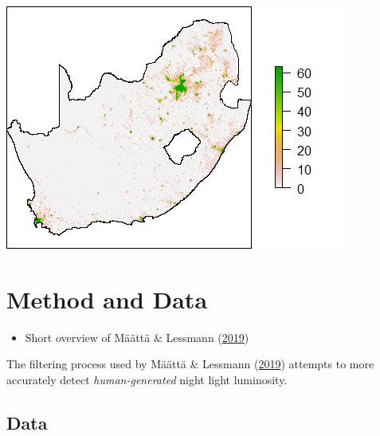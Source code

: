 \documentclass[11pt,preprint, authoryear]{elsarticle}
\let\origfigure\figure
\let\endorigfigure\endfigure
\renewenvironment{figure}[1][2] {
    \expandafter\origfigure\expandafter[H]
} {
    \endorigfigure
}
\numberwithin{equation}{section}
\numberwithin{figure}{section}
\numberwithin{table}{section}
\def\tightlist{} %
\begin{document}
\begin{figure}[H]
\includegraphics[width=1\linewidth]{figures/final} \caption{\label{result_plot} Human Lights Image }\label{fig:final}
\end{figure}

\hypertarget{method-and-data}{%
\section{\texorpdfstring{Method and Data
\label{Methodology}}{Method and Data }}\label{method-and-data}}

\begin{itemize}
\tightlist
\item
  Short overview of Määttä \& Lessmann
  (\protect\hyperlink{ref-maatta}{2019})
\end{itemize}

The filtering process used by Määttä \& Lessmann
(\protect\hyperlink{ref-maatta}{2019}) attempts to more accurately
detect \emph{human-generated} night light luminosity.

\hypertarget{data}{%
\subsection{Data}\label{data}}
\end{document}
